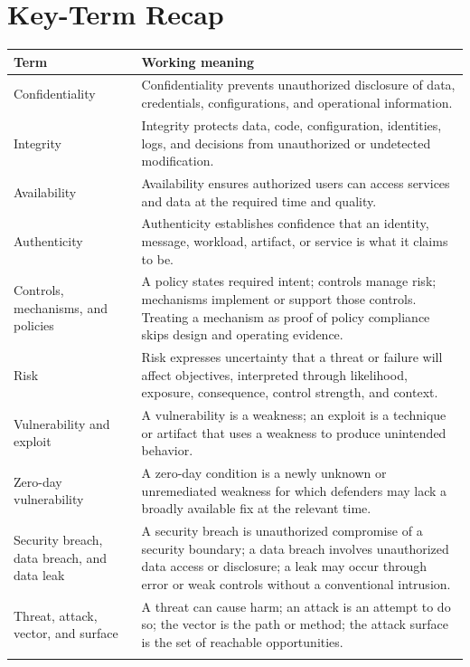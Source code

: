\documentclass[11pt]{article}
\begin{document}
\section{Key-Term Recap}
\begin{longtable}{@{}>{\RaggedRight\arraybackslash}p{}>{\RaggedRight\arraybackslash}p{}@{}}
\toprule\rowcolor{Navy}\color{white}\textbf{Term} & \color{white}\textbf{Working meaning}\\\midrule\endhead
Confidentiality & Confidentiality prevents unauthorized disclosure of data, credentials, configurations, and operational information. \\\addlinespace[2pt]
Integrity & Integrity protects data, code, configuration, identities, logs, and decisions from unauthorized or undetected modification. \\\addlinespace[2pt]
Availability & Availability ensures authorized users can access services and data at the required time and quality. \\\addlinespace[2pt]
Authenticity & Authenticity establishes confidence that an identity, message, workload, artifact, or service is what it claims to be. \\\addlinespace[2pt]
Controls, mechanisms, and policies & A policy states required intent; controls manage risk; mechanisms implement or support those controls. Treating a mechanism as proof of policy compliance skips design and operating evidence. \\\addlinespace[2pt]
Risk & Risk expresses uncertainty that a threat or failure will affect objectives, interpreted through likelihood, exposure, consequence, control strength, and context. \\\addlinespace[2pt]
Vulnerability and exploit & A vulnerability is a weakness; an exploit is a technique or artifact that uses a weakness to produce unintended behavior. \\\addlinespace[2pt]
Zero-day vulnerability & A zero-day condition is a newly unknown or unremediated weakness for which defenders may lack a broadly available fix at the relevant time. \\\addlinespace[2pt]
Security breach, data breach, and data leak & A security breach is unauthorized compromise of a security boundary; a data breach involves unauthorized data access or disclosure; a leak may occur through error or weak controls without a conventional intrusion. \\\addlinespace[2pt]
Threat, attack, vector, and surface & A threat can cause harm; an attack is an attempt to do so; the vector is the path or method; the attack surface is the set of reachable opportunities. \\\addlinespace[2pt]

\end{longtable}
\end{document}
